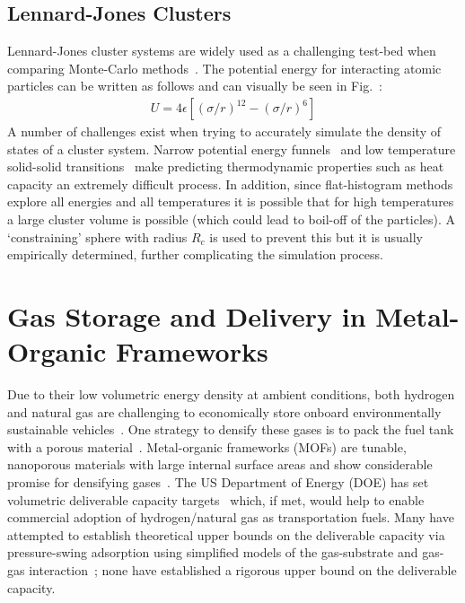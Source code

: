 \subsection{Lennard-Jones Clusters}
Lennard-Jones cluster systems are widely used as a challenging test-bed when comparing Monte-Carlo
methods~\cite{doye1998thermodynamics, poulain2006performances, martiniani2014superposition}. The potential
energy for interacting atomic particles can be written as follows and can visually be seen in Fig.~\cite{fig:well-potential}:
\begin{align}
U = 4\epsilon \left[\left( \sigma/r \right)^{12} - \left( \sigma/r \right)^{6}\right]
\end{align}
A number of challenges exist when trying to accurately simulate the density of states of a cluster system.
Narrow potential energy funnels~\cite{mandelshtam2006multiple, wales1997global} and low temperature solid-solid
transitions~\cite{neirotti2000phase, calvo2000phase, calvo2000entropic} make predicting thermodynamic properties
such as heat capacity an extremely difficult process. In addition, since flat-histogram methods explore all
energies and all temperatures it is possible that for high temperatures a large cluster volume is possible
(which could lead to boil-off of the particles). A `constraining' sphere with radius $R_c$ is used to prevent
this but it is usually empirically determined, further complicating the simulation process.

\section{Gas Storage and Delivery in Metal-Organic Frameworks}


Due to their low volumetric energy density at ambient conditions, both hydrogen
and natural gas are challenging to economically store onboard environmentally
sustainable vehicles~\cite{mason2014evaluating, sircar2002pressure}. One
strategy to densify these gases is to pack the fuel tank with a porous
material~\cite{schoedel2016role}. Metal-organic frameworks (MOFs) are tunable, nanoporous
materials with large internal surface areas and show considerable promise for
densifying gases~\cite{makal2012methane,mason2014evaluating,
suh2011hydrogen,garcia2018benchmark, schoedel2016role}. The US Department of
Energy (DOE) has set volumetric deliverable capacity targets~\cite{simon2015materials, h2targetsDOE} which, if met, would help to enable 
commercial adoption of hydrogen/natural gas as
transportation fuels. Many have attempted to establish theoretical upper bounds
on the deliverable capacity via pressure-swing adsorption using simplified
models of the gas-substrate and gas-gas interaction~\cite{gomez2014exploring, 
gomez2017impact, kaija2018high, lee2019predicting}; none have
established a rigorous upper bound on the deliverable capacity.

